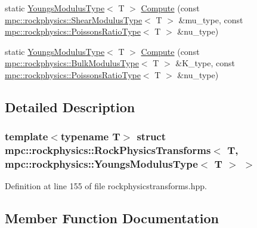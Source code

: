 \begin{DoxyCompactItemize}
\item 
static \mbox{\hyperlink{structmpc_1_1rockphysics_1_1_youngs_modulus_type}{Youngs\+Modulus\+Type}}$<$ T $>$ \mbox{\hyperlink{structmpc_1_1rockphysics_1_1_rock_physics_transforms_3_01_t_00_01mpc_1_1rockphysics_1_1_youngs_modulus_type_3_01_t_01_4_01_4_aa649c6e5deffc9d8d38823818fb1b75f}{Compute}} (const \mbox{\hyperlink{structmpc_1_1rockphysics_1_1_shear_modulus_type}{mpc\+::rockphysics\+::\+Shear\+Modulus\+Type}}$<$ T $>$ \&mu\+\_\+type, const \mbox{\hyperlink{structmpc_1_1rockphysics_1_1_poissons_ratio_type}{mpc\+::rockphysics\+::\+Poissons\+Ratio\+Type}}$<$ T $>$ \&nu\+\_\+type)
\item 
static \mbox{\hyperlink{structmpc_1_1rockphysics_1_1_youngs_modulus_type}{Youngs\+Modulus\+Type}}$<$ T $>$ \mbox{\hyperlink{structmpc_1_1rockphysics_1_1_rock_physics_transforms_3_01_t_00_01mpc_1_1rockphysics_1_1_youngs_modulus_type_3_01_t_01_4_01_4_ae9d74f99a514f43ea09d1259ab8d1dbf}{Compute}} (const \mbox{\hyperlink{structmpc_1_1rockphysics_1_1_bulk_modulus_type}{mpc\+::rockphysics\+::\+Bulk\+Modulus\+Type}}$<$ T $>$ \&K\+\_\+type, const \mbox{\hyperlink{structmpc_1_1rockphysics_1_1_poissons_ratio_type}{mpc\+::rockphysics\+::\+Poissons\+Ratio\+Type}}$<$ T $>$ \&nu\+\_\+type)
\end{DoxyCompactItemize}


\subsection{Detailed Description}
\subsubsection*{template$<$typename T$>$\newline
struct mpc\+::rockphysics\+::\+Rock\+Physics\+Transforms$<$ T, mpc\+::rockphysics\+::\+Youngs\+Modulus\+Type$<$ T $>$ $>$}



Definition at line 155 of file rockphysicstransforms.\+hpp.



\subsection{Member Function Documentation}
\mbox{\label{structmpc_1_1rockphysics_1_1_rock_physics_transforms_3_01_t_00_01mpc_1_1rockphysics_1_1_youngs_modulus_type_3_01_t_01_4_01_4_ae76cbcdd212d4ef682050511b802ddba}} 
